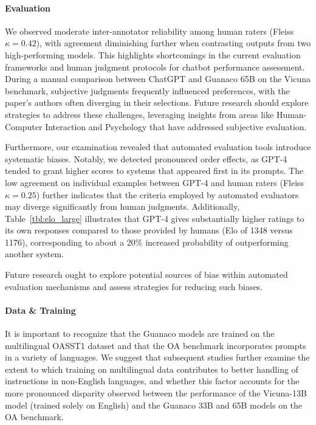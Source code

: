\paragraph{Evaluation}

We observed moderate inter-annotator reliability among human raters (Fleiss $\kappa=0.42$), with agreement diminishing further when contrasting outputs from two high-performing models. This highlights shortcomings in the current evaluation frameworks and human judgment protocols for chatbot performance assessment. During a manual comparison between ChatGPT and {Guanaco} 65B on the Vicuna benchmark, subjective judgments frequently influenced preferences, with the paper's authors often diverging in their selections. Future research should explore strategies to address these challenges, leveraging insights from areas like Human-Computer Interaction and Psychology that have addressed subjective evaluation.

Furthermore, our examination revealed that automated evaluation tools introduce systematic biases. Notably, we detected pronounced order effects, as GPT-4 tended to grant higher scores to systems that appeared first in its prompts. The low agreement on individual examples between GPT-4 and human raters (Fleiss $\kappa=0.25$) further indicates that the criteria employed by automated evaluators may diverge significantly from human judgments. Additionally, Table~\ref{tbl:elo_large} illustrates that GPT-4 gives substantially higher ratings to its own responses compared to those provided by humans (Elo of 1348 versus 1176), corresponding to about a 20\% increased probability of outperforming another system.

Future research ought to explore potential sources of bias within automated evaluation mechanisms and assess strategies for reducing such biases.

\paragraph{Data \& Training} It is important to recognize that the {Guanaco} models are trained on the multilingual OASST1 dataset and that the OA benchmark incorporates prompts in a variety of languages. We suggest that subsequent studies further examine the extent to which training on multilingual data contributes to better handling of instructions in non-English languages, and whether this factor accounts for the more pronounced disparity observed between the performance of the Vicuna-13B model (trained solely on English) and the {Guanaco} 33B and 65B models on the OA benchmark.


